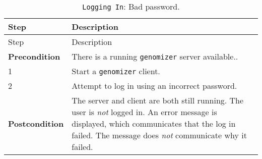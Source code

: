 \begin{longtable}[c]{@{}ll@{}}
\caption{\texttt{Logging\ In}: Bad password.}\tabularnewline
\toprule
\begin{minipage}[b]{0.31\columnwidth}\raggedright\strut
Step
\strut\end{minipage} &
\begin{minipage}[b]{0.63\columnwidth}\raggedright\strut
Description
\strut\end{minipage}\tabularnewline
\midrule
\endfirsthead
\toprule
\begin{minipage}[b]{0.31\columnwidth}\raggedright\strut
Step
\strut\end{minipage} &
\begin{minipage}[b]{0.63\columnwidth}\raggedright\strut
Description
\strut\end{minipage}\tabularnewline
\midrule
\endhead
\begin{minipage}[t]{0.31\columnwidth}\raggedright\strut
\textbf{Precondition}
\strut\end{minipage} &
\begin{minipage}[t]{0.63\columnwidth}\raggedright\strut
There is a running \texttt{genomizer} server available..
\strut\end{minipage}\tabularnewline
\begin{minipage}[t]{0.31\columnwidth}\raggedright\strut
1
\strut\end{minipage} &
\begin{minipage}[t]{0.63\columnwidth}\raggedright\strut
Start a \texttt{genomizer} client.
\strut\end{minipage}\tabularnewline
\begin{minipage}[t]{0.31\columnwidth}\raggedright\strut
2
\strut\end{minipage} &
\begin{minipage}[t]{0.63\columnwidth}\raggedright\strut
Attempt to log in using an incorrect password.
\strut\end{minipage}\tabularnewline
\begin{minipage}[t]{0.31\columnwidth}\raggedright\strut
\textbf{Postcondition}
\strut\end{minipage} &
\begin{minipage}[t]{0.63\columnwidth}\raggedright\strut
The server and client are both still running. The user is \emph{not}
logged in. An error message is displayed, which communicates that the
log in failed. The message does \emph{not} communicate why it failed.
\strut\end{minipage}\tabularnewline
\bottomrule
\end{longtable}

